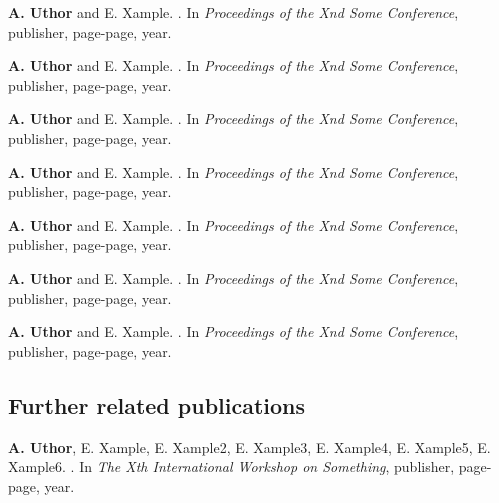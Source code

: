 \documentclass{article}
\begin{document}
\begin{enumerate}[wide = 0pt, widest = {[4]}, leftmargin =*]

\item[{[3]}] \textbf{A. Uthor} and E. Xample.
.
\newblock In \emph{Proceedings of the Xnd Some Conference}, publisher, page-page, year.
\vspace*{1em}
\item[{[4]}] \textbf{A. Uthor} and E. Xample.
.
\newblock In \emph{Proceedings of the Xnd Some Conference}, publisher, page-page, year.
\vspace*{1em}
\item[{[5]}] \textbf{A. Uthor} and E. Xample.
.
\newblock In \emph{Proceedings of the Xnd Some Conference}, publisher, page-page, year.
\vspace*{1em}
\item[{[6]}] \textbf{A. Uthor} and E. Xample.
.
\newblock In \emph{Proceedings of the Xnd Some Conference}, publisher, page-page, year.
\vspace*{1em}
\item[{[7]}] \textbf{A. Uthor} and E. Xample.
.
\newblock In \emph{Proceedings of the Xnd Some Conference}, publisher, page-page, year.
\vspace*{1em}
\item[{[8]}] \textbf{A. Uthor} and E. Xample.
.
\newblock In \emph{Proceedings of the Xnd Some Conference}, publisher, page-page, year.
\vspace*{1em}
\item[{[9]}] \textbf{A. Uthor} and E. Xample.
.
\newblock In \emph{Proceedings of the Xnd Some Conference}, publisher, page-page, year.
\end{enumerate}

\vspace*{2.00em}

\subsection*{Further related publications}
\vspace*{1em}

\begin{enumerate}[wide = 0pt, widest = {[15]}, leftmargin =*]

\item[{[10]}] \textbf{A. Uthor}, E. Xample, E. Xample2, E. Xample3, E. Xample4, E. Xample5, E. Xample6.
.
\newblock In \emph{The Xth International Workshop on Something}, publisher, page-page, year.

\end{enumerate}
\end{document}
